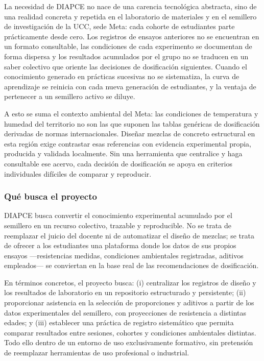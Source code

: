 \documentclass[12pt, letterpaper]{article}
\begin{document}
La necesidad de DIAPCE no nace de una carencia tecnológica abstracta, sino de una realidad concreta y repetida en el laboratorio de materiales y en el semillero de investigación de la UCC, sede Meta: cada cohorte de estudiantes parte prácticamente desde cero. Los registros de ensayos anteriores no se encuentran en un formato consultable, las condiciones de cada experimento se documentan de forma dispersa y los resultados acumulados por el grupo no se traducen en un saber colectivo que oriente las decisiones de dosificación siguientes. Cuando el conocimiento generado en prácticas sucesivas no se sistematiza, la curva de aprendizaje se reinicia con cada nueva generación de estudiantes, y la ventaja de pertenecer a un semillero activo se diluye.

A esto se suma el contexto ambiental del Meta: las condiciones de temperatura y humedad del territorio no son las que suponen las tablas genéricas de dosificación derivadas de normas internacionales. Diseñar mezclas de concreto estructural en esta región exige contrastar esas referencias con evidencia experimental propia, producida y validada localmente. Sin una herramienta que centralice y haga consultable ese acervo, cada decisión de dosificación se apoya en criterios individuales difíciles de comparar y reproducir.

\subsubsection*{Qué busca el proyecto}

DIAPCE busca convertir el conocimiento experimental acumulado por el semillero en un recurso colectivo, trazable y reproducible. No se trata de reemplazar el juicio del docente ni de automatizar el diseño de mezclas; se trata de ofrecer a los estudiantes una plataforma donde los datos de sus propios ensayos ---resistencias medidas, condiciones ambientales registradas, aditivos empleados--- se conviertan en la base real de las recomendaciones de dosificación.

En términos concretos, el proyecto busca: (i) centralizar los registros de diseño y los resultados de laboratorio en un repositorio estructurado y persistente; (ii) proporcionar asistencia en la selección de proporciones y aditivos a partir de los datos experimentales del semillero, con proyecciones de resistencia a distintas edades; y (iii) establecer una práctica de registro sistemático que permita comparar resultados entre sesiones, cohortes y condiciones ambientales distintas. Todo ello dentro de un entorno de uso exclusivamente formativo, sin pretensión de reemplazar herramientas de uso profesional o industrial.
\end{document}
